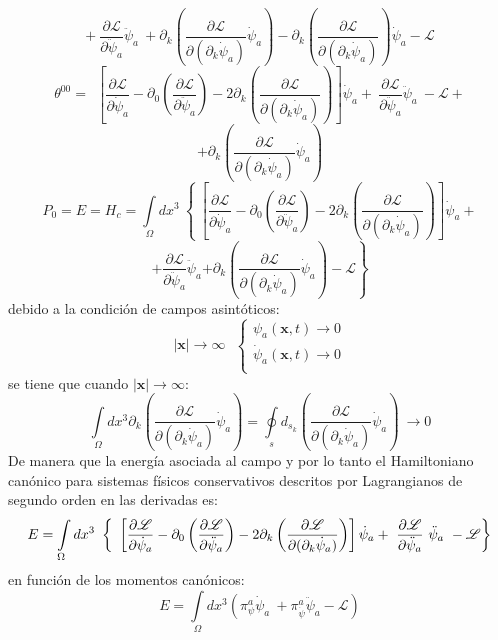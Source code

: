 \documentclass[a4paper,12pt]{article}
\begin{document}
$$+\ \frac{\partial\mathscr{L} }{\partial\ddot \psi_a}\ddot\psi_a\ + \partial_k\left(\frac{\partial\mathscr{L} }{\partial(\partial_{k}\dot \psi_a)}\dot\psi_a\right)-\partial_k\left(\frac{\partial\mathscr{L} }{\partial(\partial_{k}\dot \psi_a)}\right)\dot\psi_a-\mathscr{L} $$
\begin{equation}
\theta^{00}= \ \ \left[\frac{\partial \mathscr{L} }{\partial\dot \psi_a}-\partial_{0}\left(\frac{\partial\mathscr{L} }{\partial\ddot \psi_a}  \right)-2\partial_{k}\left(\frac{\partial\mathscr{L} }{\partial(\partial_{k}\dot \psi_a)}  \right) \right]\dot\psi_a +\ \frac{\partial\mathscr{L} }{\partial\ddot \psi_a}\ddot\psi_a\ -\mathscr{L}+ 
\end{equation}
$$+ \partial_k\left(\frac{\partial\mathscr{L} }{\partial(\partial_{k}\dot \psi_a)}\dot\psi_a\right)$$
\begin{equation}
P_0=E=H_c=\int\limits_{\Omega}dx^{3}\ \left\{\ \left[\frac{\partial \mathscr{L} }{\partial\dot \psi_a}-\partial_{0}\left(\frac{\partial\mathscr{L} }{\partial\ddot \psi_a}  \right)-2\partial_{k}\left(\frac{\partial\mathscr{L} }{\partial(\partial_{k}\dot \psi_a)}  \right) \right]\dot\psi_a +\right.
\end{equation}
$$+\frac{\partial\mathscr{L} }{\partial\ddot \psi_a}\ddot\psi_a\left. + \partial_k\left(\frac{\partial\mathscr{L} }{\partial(\partial_{k}\dot \psi_a)}\dot\psi_a\right)-\mathscr{L}\right\} $$
debido a la condición de campos asintóticos:
\begin{equation}
|\textbf{x}|\rightarrow\infty \ \ \ \left\{ \begin{array}{lcl}
\psi_a(\textbf{x},t)\rightarrow0 \\
\dot \psi_a(\textbf{x},t)\rightarrow0 \\
\end{array}
\right.
\end{equation}
se tiene que cuando $|\textbf{x}|\rightarrow\infty$:
\begin{equation}
\int\limits_{\Omega}dx^{3}\partial_k\left(\frac{\partial\mathscr{L} }{\partial(\partial_{k}\dot \psi_a)}\dot\psi_a\right)=\oint\limits_{s}d_{s_k}\left(\frac{\partial\mathscr{L} }{\partial(\partial_{k}\dot \psi_a)}\dot\psi_a\right)\ \rightarrow0 
\end{equation}
De manera que la energía asociada al campo y por lo tanto el Hamiltoniano canónico para sistemas físicos conservativos descritos por Lagrangianos de segundo orden en las derivadas es:
{\small\begin{equation}
E=\int\limits_{\Omega}dx^{3}\ \left\{\\\ \left[\frac{\partial \mathscr{L} }{\partial\dot \psi_a}-\partial_{0}\left(\frac{\partial\mathscr{L} }{\partial\ddot \psi_a}  \right)-2\partial_{k}\left(\frac{\partial\mathscr{L} }{\partial(\partial_{k}\dot \psi_a)}  \right) \right] \dot\psi_a +\ \frac{\partial\mathscr{L} }{\partial\ddot \psi_a}\ \ddot\psi_a\ -\mathscr{L}\right\} 
\end{equation}}
en función de los momentos canónicos:
\begin{equation}
E=\int\limits_{\Omega}dx^{3}\left(\pi^{a}_{\psi}\dot\psi_a\ +\pi^{a}_{\dot\psi} \ddot\psi_a-\mathscr{L}\right)
\end{equation}
\vspace{0,4cm}
\end{document}
